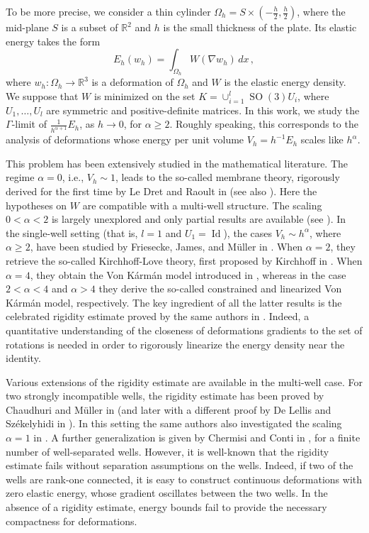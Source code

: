 \documentclass{article}
\theoremstyle{plain}
\theoremstyle{plain}
\theoremstyle{plain}
\theoremstyle{plain}
\theoremstyle{plain}
\theoremstyle{definition}
\theoremstyle{definition}
\renewcommand{\r}{\mathbb{R}}
\DeclareMathOperator{\Id}{Id}
\DeclareMathOperator{\SO}{SO}
\begin{document}
To be more precise, we consider a thin cylinder $\Omega_h = S \times (-\frac{h}{2}, \frac{h}{2})$, where the mid-plane $S$ is a subset of $\r^2$ and $h$ is the small thickness of the plate. Its elastic energy takes the form
\[
	E_h(w_h) = \int_{\Omega_h} W(\nabla w_h) \, dx\,,
\] 
where $w_h: \Omega_h \to \r^3$ is a deformation of $\Omega_h$ and
$W$ is the elastic energy density. We suppose that $W$ is minimized on the set $K = \cup_{i=1}^l \SO(3)U_i$, where $U_1, \dots, U_l$ are symmetric and positive-definite matrices. In this work, we study the $\Gamma$-limit of $\frac{1}{h^{\alpha + 1}}E_h$, as $h \to 0$, for $\alpha \geq 2$. Roughly speaking, this corresponds to the analysis of deformations whose energy per unit volume $V_h = h^{-1}E_h$ scales like $h^{\alpha}$.

This problem has been extensively studied in the mathematical literature.
The regime $\alpha = 0$, i.e., $V_h \sim 1$, leads to the so-called membrane theory, rigorously derived for the first time by Le Dret and Raoult in \cite{LEDRET1995} (see also \cite{FREDDI2004, HANZAAFSA2008}). 
Here the hypotheses on $ W $ are compatible with a multi-well structure.
The scaling $0 < \alpha < 2$ is largely unexplored and only partial results are available (see \cite{CONTI2007}). In the single-well setting (that is, $l = 1$ and $U_1 = \Id$), the cases $V_h \sim h^\alpha$, where $\alpha \geq 2$, have been studied by Friesecke, James, and M\"uller in \cite{FRIESECKE2002, FRIESECKE2006}. When $\alpha = 2$, they retrieve the so-called Kirchhoff-Love theory, first proposed by Kirchhoff in \cite{KIRCHOFF1850}. When $\alpha = 4$, they obtain the Von K\'arm\'an model introduced in \cite{VONKARMAN1907}, whereas in the case $2 < \alpha < 4$ and $\alpha > 4$ they derive the so-called constrained and linearized Von K\'arm\'an model, respectively. The key ingredient of all the latter results is the celebrated rigidity estimate proved by the same authors in \cite{FRIESECKE2006}. Indeed, a quantitative understanding of the closeness of deformations gradients to the set of rotations is needed in order to rigorously linearize the energy density near the identity.

Various extensions of the rigidity estimate are available in the multi-well case. For two strongly incompatible wells, the rigidity estimate has been proved by Chaudhuri and M\"uller in \cite{CHAUDHURI2004} (and later with a different proof by De Lellis and Székelyhidi in \cite{DELELLIS2006}).
In this setting the same authors also investigated the scaling $\alpha = 1$ in \cite{CHAUDHURI2006}. A further generalization is given by Chermisi and Conti in \cite{CHERMISI2010}, for a finite number of well-separated wells. However, it is well-known that the rigidity estimate fails without separation assumptions on the wells. Indeed, if two of the wells are rank-one connected, it is easy to construct continuous deformations with zero elastic energy, whose gradient oscillates between the two wells. In the absence of a rigidity estimate, energy bounds fail to provide the necessary compactness for deformations. 
\end{document}
